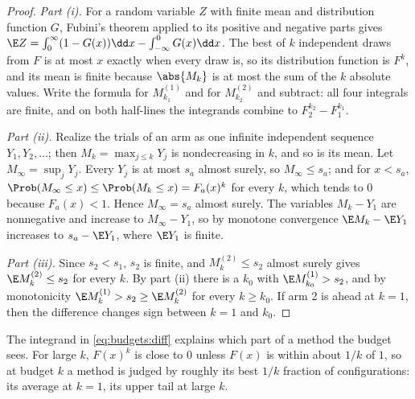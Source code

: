 \begin{refsection}
\begin{proof}
\emph{Part (i).} For a random variable $Z$ with finite mean and distribution function $G$, Fubini's theorem applied to its positive and negative parts gives $\E Z=\int_0^\infty(1-G(x))\dd x-\int_{-\infty}^0G(x)\dd x$. The best of $k$ independent draws from $F$ is at most $x$ exactly when every draw is, so its distribution function is $F^k$, and its mean is finite because $\abs{M_k}$ is at most the sum of the $k$ absolute values. Write the formula for $M_{k_1}^{(1)}$ and for $M_{k_2}^{(2)}$ and subtract: all four integrals are finite, and on both half-lines the integrands combine to $F_2^{k_2}-F_1^{k_1}$.

\emph{Part (ii).} Realize the trials of an arm as one infinite independent sequence $Y_1,Y_2,\dots$; then $M_k=\max_{j\le k}Y_j$ is nondecreasing in $k$, and so is its mean. Let $M_\infty=\sup_jY_j$. Every $Y_j$ is at most $s_a$ almost surely, so $M_\infty\le s_a$; and for $x<s_a$, $\Prob(M_\infty\le x)\le\Prob(M_k\le x)=F_a(x)^k$ for every $k$, which tends to $0$ because $F_a(x)<1$. Hence $M_\infty=s_a$ almost surely. The variables $M_k-Y_1$ are nonnegative and increase to $M_\infty-Y_1$, so by monotone convergence $\E M_k-\E Y_1$ increases to $s_a-\E Y_1$, where $\E Y_1$ is finite.

\emph{Part (iii).} Since $s_2<s_1$, $s_2$ is finite, and $M_k^{(2)}\le s_2$ almost surely gives $\E M_k^{(2)}\le s_2$ for every $k$. By part (ii) there is a $k_0$ with $\E M_{k_0}^{(1)}>s_2$, and by monotonicity $\E M_k^{(1)}>s_2\ge\E M_k^{(2)}$ for every $k\ge k_0$. If arm 2 is ahead at $k=1$, then the difference changes sign between $k=1$ and $k_0$.
\end{proof}

The integrand in \eqref{eq:budgets:diff} explains which part of a method the budget sees. For large $k$, $F(x)^k$ is close to $0$ unless $F(x)$ is within about $1/k$ of $1$, so at budget $k$ a method is judged by roughly its best $1/k$ fraction of configurations: its average at $k=1$, its upper tail at large $k$.



\end{refsection}
